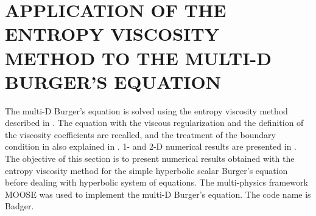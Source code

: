 %
%
%

\chapter{\uppercase {Application of the entropy viscosity method to the multi-D Burger's equation}}\label{chap:burger_chap3}
The multi-D Burger's equation is solved using the entropy viscosity method described in . The equation with the viscous regularization and the definition of the viscosity coefficients are recalled, and the treatment of the boundary condition in also explained in . 1- and 2-D numerical results are presented in . The objective of this section is to present numerical results obtained with the entropy viscosity method for the simple hyperbolic scalar Burger's equation before dealing with hyperbolic system of equations. The multi-physics framework MOOSE \cite{Moose} was used to implement the multi-D Burger's equation. The code name is Badger.

